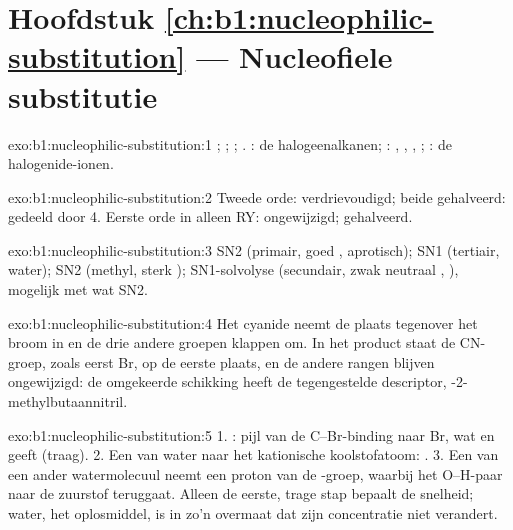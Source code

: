 \section*{Hoofdstuk \ref{ch:b1:nucleophilic-substitution} --- Nucleofiele substitutie}

\begin{solution}{exo:b1:nucleophilic-substitution:1}
; ; ;
. : de halogeenalkanen; :
, , , ; : de
halogenide-ionen.
\end{solution}

\begin{solution}{exo:b1:nucleophilic-substitution:2}
Tweede orde: verdrievoudigd; beide gehalveerd: gedeeld door 4. Eerste
orde in alleen RY: ongewijzigd; gehalveerd.
\end{solution}

\begin{solution}{exo:b1:nucleophilic-substitution:3}
SN2 (primair, goed , aprotisch); SN1 (tertiair, water); SN2
(methyl, sterk ); SN1-solvolyse (secundair, zwak neutraal
, ), mogelijk met wat SN2.
\end{solution}

\begin{solution}{exo:b1:nucleophilic-substitution:4}
Het cyanide neemt de plaats tegenover het broom in en de drie andere
groepen klappen om. In het product staat de CN-groep, zoals eerst Br,
op de eerste plaats, en de andere rangen blijven ongewijzigd: de
omgekeerde schikking heeft de tegengestelde descriptor,
-2-methylbutaannitril.
\end{solution}

\begin{solution}{exo:b1:nucleophilic-substitution:5}
1. : pijl van de C--Br-binding naar Br, wat  en
 geeft (traag). 2. Een  van water naar het kationische
koolstofatoom: . 3. Een  van een ander
watermolecuul neemt een proton van de -groep, waarbij het
O--H-paar naar de zuurstof teruggaat. Alleen de eerste, trage stap
bepaalt de snelheid; water, het oplosmiddel, is in zo'n overmaat dat zijn
concentratie niet verandert.
\end{solution}

